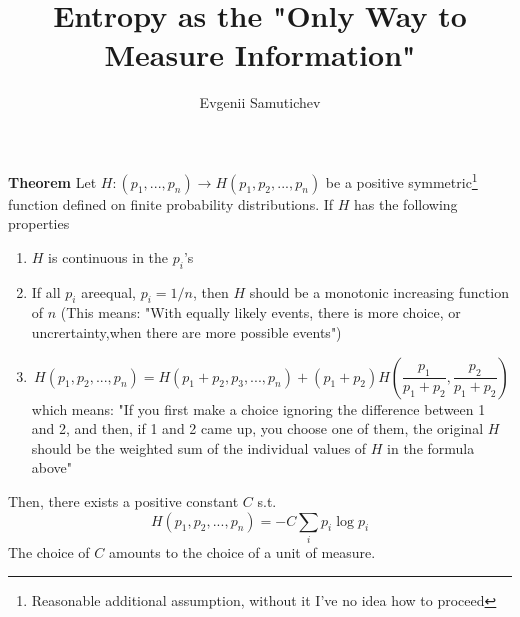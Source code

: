 \documentclass[12pt]{article}
\title{Entropy as the "Only Way to Measure Information"}
\author{Evgenii Samutichev}
\begin{document}
\maketitle

\begin{tcolorbox}
    \textbf{Theorem} Let $H : (p_1, ..., p_n) \to H(p_1, p_2, ..., p_n)$ be a positive symmetric\footnote{Reasonable additional assumption, without it I've no idea how to proceed} function defined on finite probability distributions. If $H$ has the following properties
    \begin{enumerate}[label=(\roman*)]
        \item $H$ is continuous in the $p_i$'s 
        \item If all $p_i$ areequal, $p_i = 1/n$, then $H$ should be a monotonic increasing function of $n$ (This means: "With equally likely events, there is more choice, or uncrertainty,when there are more possible events")
        \item \begin{equation}\label{eq:1}
        H(p_1, p_2, ..., p_n) = H(p_1 + p_2, p_3, ..., p_n) + (p_1+p_2)H\left(\frac{p_1}{p_1 + p_2}, \frac{p_2}{p_1 + p_2}\right)
        \end{equation}
        which means: "If you first make a choice ignoring the difference between 1 and 2, and then, if 1 and 2 came up, you choose one of them, the original $H$ should be the weighted sum of the individual values of $H$ in the formula above"
    \end{enumerate}
    Then, there exists a positive constant $C$ s.t.
    \begin{equation}
        H(p_1, p_2, ..., p_n) = -C\sum_{i}{p_i \log p_i}
    \end{equation}
    The choice of $C$ amounts to the choice of a unit of measure.
\end{tcolorbox}
\end{document}
